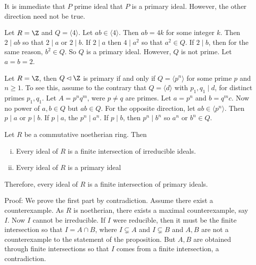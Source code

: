 \begin{rem}
It is immediate that $P$ prime ideal that $P$ is a primary ideal. However, the other direction need not be true.
\end{rem}

\begin{ex}
Let $R=\Z$ and $Q=\langle 4 \rangle$. Let $ab \in \langle 4 \rangle$. Then $ab=4k$ for some integer $k$. Then $2 \mid ab$ so that $2 \mid a$ or $2 \mid b$. If $2 \mid a$ then $4 \mid a^2$ so that $a^2 \in Q$. If $2 \mid b$, then for the same reason, $b^2 \in Q$. So $Q$ is a primary ideal. However, $Q$ is not prime. Let $a=b=2$.
\end{ex}

\begin{ex}
Let $R=\Z$, then $Q \lhd \Z$ is primary if and only if $Q=\langle p^n \rangle$ for some prime $p$ and $n \geq 1$. To see this, assume to the contrary that $Q=\langle d \rangle$ with $p_1,q_1 \mid d$, for distinct primes $p_1,q_1$. Let $A=p^nq^m$, were $p \neq q$ are primes. Let $a=p^n$ and $b=q^mc$. Now no power of $a,b \in Q$ but $ab \in Q$. For the opposite direction, let $ab \in \langle p^n \rangle$. Then $p \mid a$ or $p \mid b$. If $p \mid a$, the $p^n \mid a^n$. If $p \mid b$, then $p^n \mid b^n$ so $a^n$ or $b^n \in Q$.
\end{ex}

\begin{prop}
Let $R$ be a commutative noetherian ring. Then
\begin{enumerate}[(i)]
\item Every ideal of $R$ is a finite intersection of irreducible ideals.
\item Every ideal of $R$ is a primary ideal
\end{enumerate}
Therefore, every ideal of $R$ is a finite intersection of primary ideals.
\end{prop}

Proof: We prove the first part by contradiction. Assume there exist a counterexample. As $R$ is noetherian, there exists a maximal counterexample, say $I$. Now $I$ cannot be irreducible. If $I$ were reducible, then it must be the finite intersection so that $I=A \cap B$, where $I \subsetneq A$ and $I \subsetneq B$ and $A,B$ are not a counterexample to the statement of the proposition. But $A,B$ are obtained through finite intersections so that $I$ comes from a finite intersection, a contradiction. 

